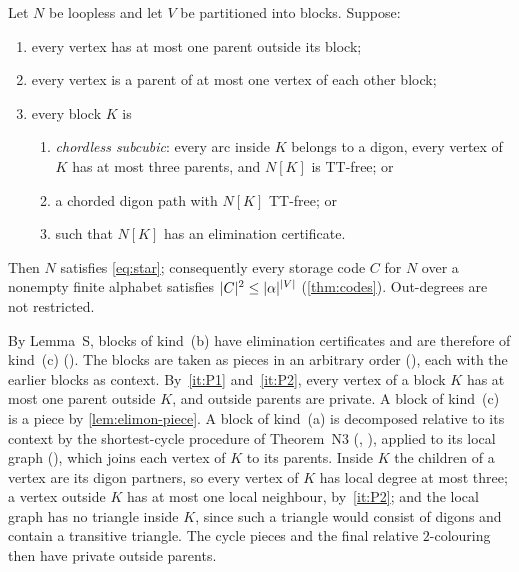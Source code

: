 \begin{theorem}\label{thm:PC}
Let $N$ be loopless and let $V$ be partitioned into blocks. Suppose:
\begin{enumerate}[label=(P\arabic*),leftmargin=3em]
\item\label{it:P1} every vertex has at most one parent outside its block;
\item\label{it:P2} every vertex is a parent of at most one vertex of each other block;
\item\label{it:P3} every block $K$ is
  \begin{enumerate}[label=(\alph*)]
  \item \emph{chordless subcubic}: every arc inside $K$ belongs to a digon, every vertex of $K$ has at most three
  parents, and $N[K]$ is TT-free; or
  \item a chorded digon path with $N[K]$ TT-free; or
  \item such that $N[K]$ has an elimination certificate.
  \end{enumerate}
\end{enumerate}
Then $N$ satisfies \eqref{eq:star}; consequently every storage code $C$ for $N$ over a nonempty finite alphabet satisfies
$\lvert C \rvert^2\le\lvert \alpha \rvert^{\lvert V \rvert}$ (\cref{thm:codes}). Out-degrees are not restricted.
\end{theorem}

\begin{outline}
By Lemma~S, blocks of kind~(b) have elimination certificates and are therefore of kind~(c)
(). The blocks are taken as pieces in an arbitrary order (), each with the earlier blocks as context.
By~\ref{it:P1} and~\ref{it:P2}, every vertex of a block $K$ has at most one parent outside $K$, and outside parents are
private. A block of kind~(c) is a piece by \cref{lem:elimon-piece}. A block of kind~(a) is decomposed relative to its
context by the shortest-cycle procedure of Theorem~N3 (, ),
applied to its local graph (), which joins each vertex of $K$ to its parents. Inside $K$ the children of
a vertex are its digon partners, so every vertex of $K$ has local degree at most three; a vertex outside $K$ has at most
one local neighbour, by~\ref{it:P2}; and the local graph has no triangle inside $K$, since such a triangle would consist
of digons and contain a transitive triangle. The cycle pieces and the final relative $2$-colouring then have private
outside parents.
\end{outline}

